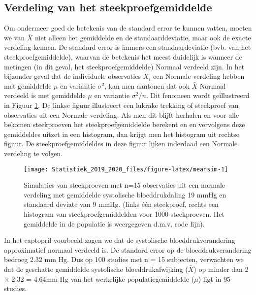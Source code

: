 \documentclass[12pt,dutch,coursenotes]{book}
\theoremstyle{definition}
\theoremstyle{definition}
\theoremstyle{definition}
\theoremstyle{remark}
\begin{document}
\subsection{Verdeling van het
steekproefgemiddelde}\label{subsec:verdelingXbar}

Om ondermeer goed de betekenis van de standard error te kunnen vatten,
moeten we van \(\bar X\) niet alleen het gemiddelde en de
standaarddeviatie, maar ook de exacte verdeling kennen. De standard
error is immers een standaardeviatie (bvb. van het
steekproefgemiddelde), waarvan de betekenis het meest duidelijk is
wanneer de metingen (in dit geval, het steekproefgemiddelde) Normaal
verdeeld zijn. In het bijzonder geval dat de individuele observaties
\(X_i\) een Normale verdeling hebben met gemiddelde \(\mu\) en variantie
\(\sigma^2\), kan men aantonen dat ook \(\bar X\) Normaal verdeeld is
met gemiddelde \(\mu\) en variantie \(\sigma^2/n.\) Dit fenomeen wordt
geïllustreerd in Figuur \ref{fig:meansim}. De linkse figuur illustreert
een lukrake trekking of steekproef van observaties uit een Normale
verdeling. Als men dit blijft herhalen en voor alle bekomen steekproeven
het steekproefgemiddelde berekent en en vervolgens deze gemiddeldes
uitzet in een histogram, dan krijgt men het histogram uit rechtse
figuur. De steekproefgemiddeldes in deze figuur lijken inderdaad een
Normale verdeling te volgen.

\begin{figure}

{\centering \texttt{[image: Statistiek\_2019\_2020\_files/figure-latex/meansim-1]} 

}

\caption{Simulaties van steekproeven met n=15 observaties uit een normale verdeling met gemiddelde systolische bloeddrukdaling 19 mmHg en standaard deviate van 9 mmHg. (links één steekproef, rechts een histogram van steekproefgemiddelden voor 1000 steekproeven. Het gemiddelde in de populatie is weergegeven d.m.v. rode lijn).}\label{fig:meansim}
\end{figure}

In het captopril voorbeeld zagen we dat de systolische
bloeddrukverandering approximatief normaal verdeeld is. De standard
error op de bloeddrukverandering bedroeg 2.32 mm Hg. Dus op 100 studies
met n = 15 subjecten, verwachten we dat de geschatte gemiddelde
systolische bloeddrukafwijking (\(\bar X\)) op minder dan 2 × 2.32 =
4.64mm Hg van het werkelijke populatiegemiddelde (\(\mu\)) ligt in 95
studies.
\end{document}

